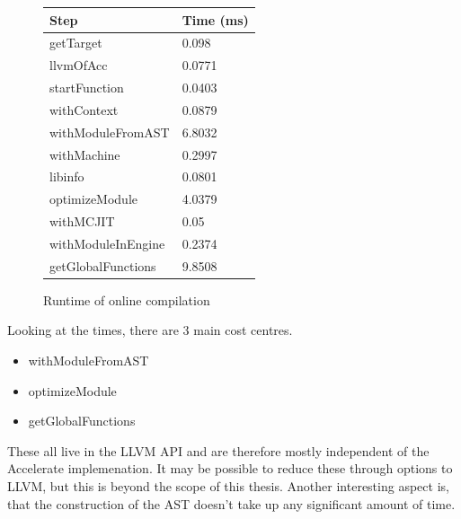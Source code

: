 \documentclass[a4paper,bibliography=totocnumbered,parskip,headsepline]{scrbook}
\begin{document}
\begin{figure}
    \centering
\begin{tabular}{ll}
Step             & Time (ms)   \\ \hline
getTarget        & 0.098  \\
llvmOfAcc              & 0.0771 \\
startFunction    & 0.0403 \\
withContext      & 0.0879 \\
withModuleFromAST       & 6.8032 \\
withMachine      & 0.2997 \\
libinfo          & 0.0801 \\
optimizeModule   & 4.0379 \\
withMCJIT        & 0.05   \\
withModuleInEngine   & 0.2374 \\
getGlobalFunctions & 9.8508 \\
\end{tabular}
\caption{Runtime of online compilation}
    \label{fig:compile}
\end{figure}

Looking at the times, there are 3 main cost centres.

\begin{itemize}[noitemsep]
 \item withModuleFromAST
 \item optimizeModule
 \item getGlobalFunctions
\end{itemize}

\newpage
These all live in the LLVM API and are therefore mostly independent of the Accelerate implemenation.
It may be possible to reduce these through options to LLVM, but this is beyond the scope of this thesis.
Another interesting aspect is, that the construction of the AST doesn't take up any significant amount of time.
\end{document}
